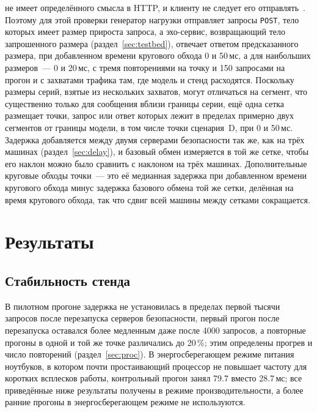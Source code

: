 \documentclass[conference,a4paper]{IEEEtran}
\newcommand{\newtext}[1]{{\color{blue}#1}}
\newcommand{\newgreen}[1]{{\color{green!50!black}#1}}
\newcommand{\newviolet}[1]{{\color{violet}#1}}
\begin{document}
{{не имеет определённого смысла в HTTP, и клиенту не следует его отправлять~\cite[разд.~9.3.1]{rfc9110}.
Поэтому для этой проверки генератор нагрузки отправляет запросы \texttt{POST}, тело которых имеет размер
прироста запроса, а эхо-сервис, возвращающий тело запрошенного размера
(раздел~\ref{sec:testbed}), отвечает ответом предсказанного размера}, при добавленном
времени кругового обхода 0 и 50\,мс, а для наибольших размеров~--- 0 и 20\,мс,
с тремя повторениями на точку и 150 запросами на прогон и с захватами трафика там, где модель
и стенд расходятся. \newviolet{Поскольку размеры серий, взятые из нескольких захватов, могут отличаться на сегмент,
что существенно только для сообщения вблизи границы серии, ещё одна сетка размещает точки,
запрос или ответ которых лежит в пределах примерно двух сегментов от границы модели, в том числе
точки сценария~D, при 0 и 50\,мс.} Задержка добавляется между двумя серверами безопасности так же, как на
трёх машинах (раздел~\ref{sec:delay}), и базовый обмен измеряется в той же сетке,
чтобы его наклон можно было сравнить с наклоном на трёх машинах. \newgreen{Дополнительные круговые
обходы точки~--- это её медианная задержка при добавленном времени кругового обхода минус задержка базового обмена
той же сетки, делённая на время кругового обхода, так что сдвиг всей машины между сетками
сокращается.}\par}

\section{Результаты}

\subsection{Стабильность стенда}

\newtext{В пилотном прогоне задержка не установилась в пределах первой тысячи запросов после
перезапуска серверов безопасности, первый прогон после перезапуска оставался более медленным даже после 4000
запросов, а повторные прогоны в одной и той же точке различались до 20\,\%; этим определены прогрев и
число повторений (раздел~\ref{sec:proc}). В энергосберегающем режиме питания ноутбуков, в
котором почти простаивающий процессор не повышает частоту для коротких всплесков работы, контрольный прогон занял
79.7 вместо 28.7\,мс; все приведённые ниже результаты получены в режиме производительности, а более ранние
прогоны в энергосберегающем режиме не используются.}
\end{document}
